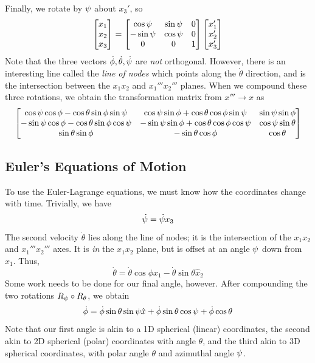 Finally, we rotate by \(\psi\) about \(x_3'\), so
\[ \begin{bmatrix}
	x_1\\x_2\\x_3
\end{bmatrix}= \begin{bmatrix}
\cos\psi & \sin\psi & 0\\
-\sin\psi & \cos\psi & 0 \\
0&0&1
\end{bmatrix} \begin{bmatrix}
	x_1'\\x_2'\\x_3'
\end{bmatrix}\]
Note that the three vectors \(\dot{\phi},\dot\theta,\dot{\psi}\) are \emph{not} orthogonal. However, there is an interesting line called the \emph{line of nodes} which points along the \(\dot\theta\) direction, and is the intersection between the \(x_1x_2\) and \(x_1'''x_2'''\) planes.
When we compound these three rotations, we obtain the transformation matrix from \(x'''\to x\) as
\begin{equation}
	\begin{bmatrix}
		\cos\psi\cos\phi-\cos\theta\sin\phi\sin\psi & \cos\psi\sin\phi + \cos\theta\cos\phi\sin\psi & \sin\psi\sin\phi\\
		-\sin\psi\cos\phi - \cos\theta\sin\phi\cos\psi & -\sin\psi\sin\phi + \cos\theta\cos\phi\cos\psi& \cos\psi\sin\theta\\
		\sin\theta\sin\phi & -\sin\theta\cos\phi & \cos\theta
	\end{bmatrix}
\end{equation}

\subsection{Euler's Equations of Motion}
To use the Euler-Lagrange equations, we must know how the coordinates change with time. Trivially, we have 
\begin{equation}
	\dot{\psi} = \dot{\psi} x_3
\end{equation}
The second velocity \(\dot\theta\) lies along the line of nodes; it is the intersection of the \(x_1x_2\) and \(x_1'''x_2'''\) axes. It is \emph{in} the \(x_1x_2\) plane, but is offset at an angle \(\psi\) down from \(x_1\). Thus,
\begin{equation}
	\dot\theta = \dot\theta \cos\phi \hat x_1 -\dot \theta \sin\theta \hat x_2
\end{equation}
Some work needs to be done for our final angle, however. After compounding the two rotations \(R_\psi\circ R_\theta\), we obtain
\begin{equation}
	\dot{\phi} = \dot \phi \sin\theta\sin\psi \hat x + \dot\phi \sin\theta\cos\psi + \dot\phi\cos\theta
\end{equation}
Note that our first angle is akin to a 1D spherical (linear) coordinates, the second akin to 2D spherical (polar) coordinates with angle \(\theta\), and the third akin to 3D spherical coordinates, with polar angle \(\theta\) and azimuthal angle \(\psi\).

